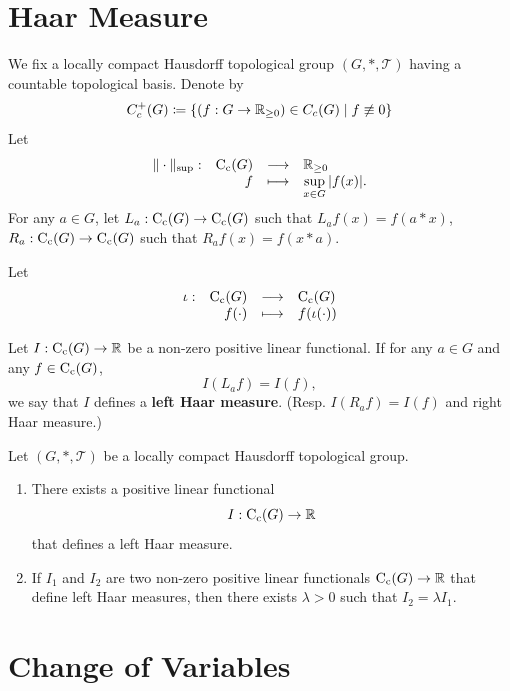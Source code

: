 \section{Haar Measure}

We fix a locally compact Hausdorff topological group $(G,*,\mathscr{T})$ having a countable topological basis.
Denote by
$$C_{c}^{+} (G) \coloneq \{(f : G \rightarrow \mathbb{R}_{\ge 0}) \in C_c(G) \mid f \not\equiv 0\}$$
Let
$$\begin{array}{rrcl}
    \| \cdot \|_{\sup} : & \operatorname{C_{c}}(G) & \longrightarrow & \mathbb{R}_{\ge 0}\\
    & f & \longmapsto & \displaystyle \sup_{x \in G} |f(x)|.
\end{array}$$
For any $a \in G$, let $L_a : \operatorname{C_{c}}(G) \rightarrow \operatorname{C_{c}}(G)$ such that $L_{a} f (x) = f(a * x)$,
$R_a : \operatorname{C_{c}}(G) \rightarrow \operatorname{C_{c}}(G)$ such that $R_{a} f (x) = f(x * a)$.

Let
$$\begin{array}{rrcl}
    \iota : & \operatorname{C_{c}}(G) & \longrightarrow & \operatorname{C_{c}}(G)\\
    & f(\cdot) & \longmapsto & f (\iota (\cdot))
\end{array}$$

\begin{definitionenv}
    Let $I : \operatorname{C_{c}}(G) \rightarrow \mathbb{R}$ be a non-zero positive linear functional.
    If for any $a \in G$ and any $f \in \operatorname{C_{c}}(G)$,
    $$I(L_a f) = I(f),$$
    we say that $I$ defines a \textbf{left Haar measure}.
    (Resp. $I(R_a f) = I(f)$ and right Haar measure.)
\end{definitionenv}

\begin{theoremenv}
    Let $(G,*,\mathscr{T})$ be a locally compact Hausdorff topological group.
    \begin{enumerate}[label=(\arabic*)]
        \item There exists a positive linear functional
            $$I : \operatorname{C_{c}}(G) \rightarrow \mathbb{R}$$
            that defines a left Haar measure.
        \item If $I_1$ and $I_2$ are two non-zero positive linear functionals $\operatorname{C_{c}}(G) \rightarrow \mathbb{R}$ that define left Haar measures,
            then there exists $\lambda > 0$ such that $I_2 = \lambda I_1$.
    \end{enumerate}
\end{theoremenv}


\section{Change of Variables}


